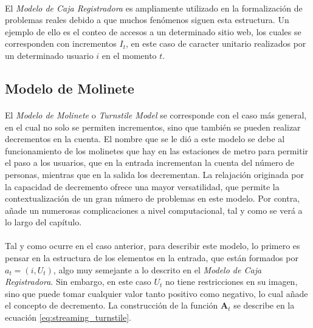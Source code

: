 \documentclass{subfiles}
\begin{document}
        \paragraph{}
        El \emph{Modelo de Caja Registradora} es ampliamente utilizado en la formalización de problemas reales debido a que muchos fenómenos siguen esta estructura. Un ejemplo de ello es el conteo de accesos a un determinado sitio web, los cuales se corresponden con incrementos $I_t$, en este caso de caracter unitario realizados por un determinado usuario $i$ en el momento $t$.


      \subsection{Modelo de Molinete}
      \label{sec:streaming_turnstile}

        \paragraph{}
        El \emph{Modelo de Molinete} o \emph{Turnstile Model} se corresponde con el caso más general, en el cual no solo se permiten incrementos, sino que también se pueden realizar decrementos en la cuenta. El nombre que se le dió a este modelo se debe al funcionamiento de los molinetes que hay en las estaciones de metro para permitir el paso a los usuarios, que en la entrada incrementan la cuenta del número de personas, mientras que en la salida los decrementan. La relajación originada por la capacidad de decremento ofrece una mayor versatilidad, que permite la contextualización de un gran número de problemas en este modelo. Por contra, añade un numerosas complicaciones a nivel computacional, tal y como se verá a lo largo del capítulo.

        \paragraph{}
        Tal y como ocurre en el caso anterior, para describir este modelo, lo primero es pensar en la estructura de los elementos en la entrada, que están formados por $a_t = (i, U_t)$, algo muy semejante a lo descrito en el \emph{Modelo de Caja Registradora}. Sin embargo, en este caso $U_t$ no tiene restricciones en su imagen, sino que puede tomar cualquier valor tanto positivo como negativo, lo cual añade el concepto de decremento. La construcción de la función $\boldsymbol{A}_{t}$ se describe en la ecuación \eqref{eq:streaming_turnstile}.
\end{document}
